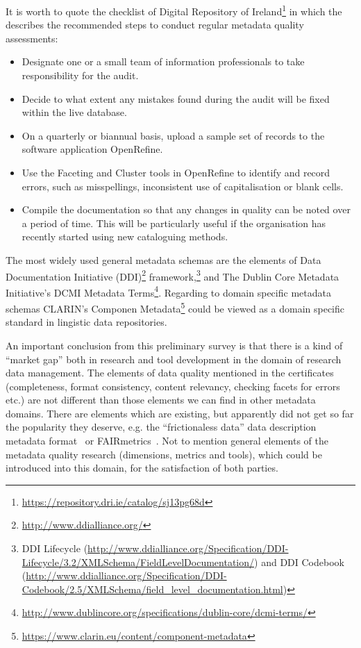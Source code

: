 It is worth to quote the checklist of Digital Repository of Ireland\footnote{\url{https://repository.dri.ie/catalog/sj13pg68d}} in which the describes the recommended steps to conduct regular metadata quality assessments:

\begin{itemize}
  \setlength{\parskip}{0pt}
  \setlength{\itemsep}{0pt plus 1pt}
  \item Designate one or a small team of information professionals to take responsibility for the audit.
  \item Decide to what extent any mistakes found during the audit will be fixed within the live database.
  \item On a quarterly or biannual basis, upload a sample set of records to the software application OpenRefine.
  \item Use the Faceting and Cluster tools in OpenRefine to identify and record errors, such as misspellings, inconsistent use of capitalisation or blank cells.
  \item Compile the documentation so that any changes in quality can be noted over a period of time. This will be particularly useful if the organisation has recently started using new cataloguing methods.
\end{itemize}

The most widely used general metadata schemas are the elements of Data Documentation Initiative (DDI)\footnote{\url{http://www.ddialliance.org/}} framework,\footnote{DDI Lifecycle (\url{http://www.ddialliance.org/Specification/DDI-Lifecycle/3.2/XMLSchema/FieldLevelDocumentation/}) and DDI Codebook (\url{http://www.ddialliance.org/Specification/DDI-Codebook/2.5/XMLSchema/field_level_documentation.html})} and The Dublin Core Metadata Initiative's DCMI Metadata Terms\footnote{\url{http://www.dublincore.org/specifications/dublin-core/dcmi-terms/}}. Regarding to domain specific metadata schemas CLARIN's Componen Metadata\footnote{\url{https://www.clarin.eu/content/component-metadata}} could be viewed as a domain specific standard in lingistic data repositories.

An important conclusion from this preliminary survey is that there is a kind of ``market gap'' both in research and tool development in the domain of research data management. The elements of data quality mentioned in the certificates (completeness, format consistency, content relevancy, checking facets for errors etc.) are not different than those elements we can find in other metadata domains. There are elements which are existing, but apparently did not get so far the popularity they deserve, e.g. the ``frictionaless data'' data description metadata format~\cite{fowler2018} or FAIRmetrics~\cite{fairmetrics}. Not to mention general elements of the metadata quality research (dimensions, metrics and tools), which could be introduced into this domain, for the satisfaction of both parties.

